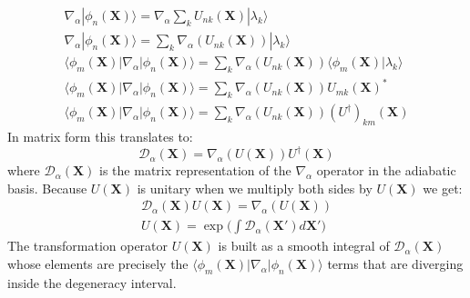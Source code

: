 \documentclass[11pt,a4paper]{article}
\begin{document}
\begin{equation*}
	\begin{gathered}
		\nabla_{\alpha} |\phi_n(\mathbf{X})\rangle = \nabla_{\alpha} \sum_k U_{nk}(\mathbf{X})|\lambda_k\rangle\\
		\nabla_{\alpha} |\phi_n(\mathbf{X})\rangle = \sum_k \nabla_{\alpha}(U_{nk}(\mathbf{X}))|\lambda_k\rangle\\
		\langle\phi_m(\mathbf{X})| \nabla_{\alpha} |\phi_n(\mathbf{X})\rangle = \sum_k \nabla_{\alpha}(U_{nk}(\mathbf{X}))\langle \phi_m(\mathbf{X})|\lambda_k\rangle \\
		\langle\phi_m(\mathbf{X})| \nabla_{\alpha} |\phi_n(\mathbf{X})\rangle = \sum_k \nabla_{\alpha}(U_{nk}(\mathbf{X}))U_{mk}(\mathbf{X})^{*} \\
		\langle\phi_m(\mathbf{X})| \nabla_{\alpha} |\phi_n(\mathbf{X})\rangle = \sum_k \nabla_{\alpha}(U_{nk}(\mathbf{X}))(U^{\dagger})_{km}(\mathbf{X})
	\end{gathered}
\end{equation*}
In matrix form this translates to:
\begin{equation*}
		\mathcal{D}_{\alpha}(\mathbf{X}) = \nabla_{\alpha}(U(\mathbf{X}))U^{\dagger}(\mathbf{X})
\end{equation*}
where  $\mathcal{D}_{\alpha}(\mathbf{X})$ is the matrix representation of the $\nabla_{\alpha}$ operator in the adiabatic basis. Because $U(\mathbf{X})$ is unitary when we multiply both sides by $U(\mathbf{X})$ we get:
\begin{equation*}
	\begin{gathered}
		\mathcal{D}_{\alpha}(\mathbf{X})U(\mathbf{X}) = \nabla_{\alpha}(U(\mathbf{X})) \\
		U(\mathbf{X}) = \exp\Bigg(\int \mathcal{D}_{\alpha}(\mathbf{X}')d\mathbf{X}'\Bigg)
	\end{gathered}
\end{equation*}
The transformation operator $U(\mathbf{X})$ is built as a smooth integral of $\mathcal{D}_{\alpha}(\mathbf{X})$ whose elements are precisely the $\langle\phi_m(\mathbf{X})| \nabla_{\alpha} |\phi_n(\mathbf{X})\rangle$ terms that are diverging inside the degeneracy interval.
\end{document}
